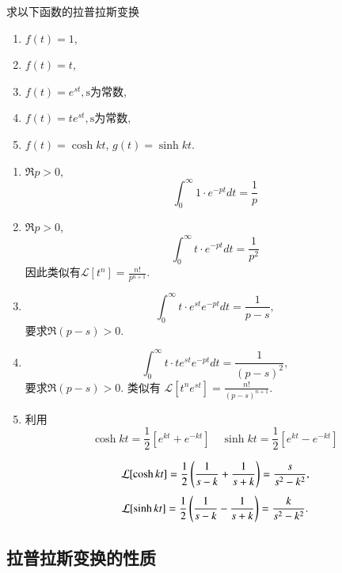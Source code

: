 \begin{examplebox}{求以下函数的拉普拉斯变换
    \begin{enumerate}
        \item $f(t) = 1$,
        \item $f(t) = t$,
        \item $f(t) =e^{s t}, \textrm{s为常数}$,
        \item $f(t) = t e^{s t}, \textrm{s为常数}$,
        \item $f(t) = \cosh {k t}$, $g(t)= \sinh {kt}$.
    \end{enumerate}}

    \begin{enumerate}
        \item $\Re p > 0$, 
            $$\int_{0}^{\infty} 1 \cdot e^{-p t} dt = \frac{1}{p}$$
        \item  $\Re p > 0$, 
            $$\int_{0}^{\infty} t \cdot e^{-p t} dt = \frac{1}{p^2}$$
            因此类似有$\mathcal{L}[t^n] = \frac{n!}{p^{n+1}}$.
        \item $$
            \int_{0}^{\infty} t \cdot e^{s t} e^{-p t} dt = \frac{1}{p-s} , 
        $$
        要求$\Re (p-s) > 0$.
        \item 
        $$
        \int_{0}^{\infty} t \cdot t e^{s t} e^{-p t} dt = \frac{1}{(p-s)^2} ,
        $$
        要求$\Re (p-s) > 0$.  
    类似有 $\mathcal{L}[t^n e^{s t}] = \frac{n!}{(p-s)^{n+1}}$.
        \item 利用
        $$
         \cosh{k t}  = \frac{1}{2} \left[ e^{kt} + e^{-kt}\right] \quad 
         \sinh{k t}  = \frac{1}{2} \left[ e^{kt} - e^{-kt}\right] 
        $$

        $$
        \mathcal{L}[ \cosh{k t} ] = {\frac{1}{2}} \left( \frac{1}{s-k} + \frac{1}{s+k} \right) = \frac{s}{s^2 - k^2} ,
        $$
        $$
        \mathcal{L}[ \sinh{k t} ] = {\frac{1}{2}} \left( \frac{1}{s-k} - \frac{1}{s+k} \right) = \frac{k}{s^2 - k^2} .
        $$
    \end{enumerate}
\end{examplebox}

\subsection{拉普拉斯变换的性质}
